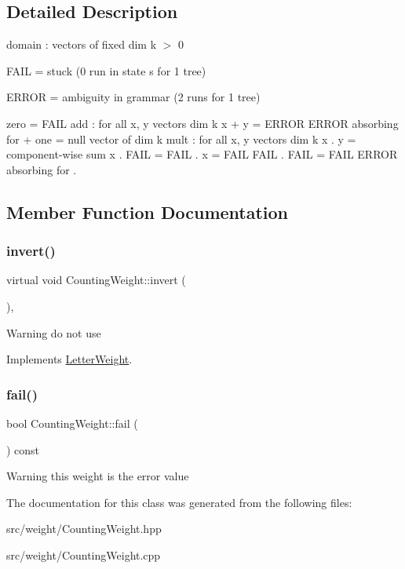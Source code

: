 \subsection{Detailed Description}
domain \+: vectors of fixed dim k $>$ 0 


\begin{DoxyItemize}
\item F\+A\+IL = stuck (0 run in state s for 1 tree)
\item E\+R\+R\+OR = ambiguity in grammar (2 runs for 1 tree)
\end{DoxyItemize}

zero = F\+A\+IL add \+: for all x, y vectors dim k x + y = E\+R\+R\+OR E\+R\+R\+OR absorbing for + one = null vector of dim k mult \+: for all x, y vectors dim k x . y = component-\/wise sum x . F\+A\+IL = F\+A\+IL . x = F\+A\+IL F\+A\+IL . F\+A\+IL = F\+A\+IL E\+R\+R\+OR absorbing for . 

\subsection{Member Function Documentation}
\mbox{\label{classCountingWeight_ab9749abc9fbcee9ed064a9be33879829}} 
\subsubsection{\texorpdfstring{invert()}{invert()}}
{\footnotesize\ttfamily virtual void Counting\+Weight\+::invert (\begin{DoxyParamCaption}{ }\end{DoxyParamCaption})\hspace{0.3cm}{\ttfamily [inline]}, {\ttfamily [virtual]}}

\begin{DoxyWarning}{Warning}
do not use 
\end{DoxyWarning}


Implements \mbox{\hyperlink{classLetterWeight_a76a013deb82c8c1511cb6a68e5a06218}{Letter\+Weight}}.

\mbox{\label{classCountingWeight_a4b5b3fa15f85d10d35f062225b35323d}} 
\subsubsection{\texorpdfstring{fail()}{fail()}}
{\footnotesize\ttfamily bool Counting\+Weight\+::fail (\begin{DoxyParamCaption}{ }\end{DoxyParamCaption}) const\hspace{0.3cm}{\ttfamily [inline]}}

\begin{DoxyWarning}{Warning}
this weight is the error value 
\end{DoxyWarning}


The documentation for this class was generated from the following files\+:\begin{DoxyCompactItemize}
\item 
src/weight/Counting\+Weight.\+hpp\item 
src/weight/Counting\+Weight.\+cpp\end{DoxyCompactItemize}
